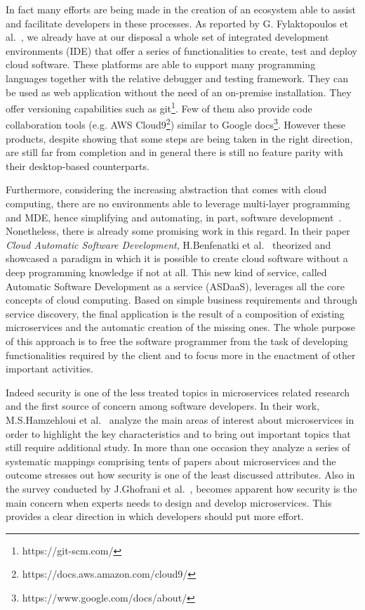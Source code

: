 \documentclass[a4paper, 10pt, conference]{ieeeconf}
\begin{document}
In fact many efforts are being made in the creation of an ecosystem able to assist and facilitate developers in these processes. As reported by G. Fylaktopoulos et al.~\cite{overview-platforms}, we already have at our disposal a whole set of integrated development environments (IDE) that offer a series of functionalities to create, test and deploy cloud software.  These platforms are able to support many programming languages together with the relative debugger and testing framework. They can be used as web application without the need of an on-premise installation. They offer versioning capabilities such as git\footnote{https://git-scm.com/}. Few of them also provide code collaboration tools (e.g. AWS Cloud9\footnote{https://docs.aws.amazon.com/cloud9/}) similar to Google docs\footnote{https://www.google.com/docs/about/}. However these products, despite showing that some steps are being taken in the right direction, are still far from completion and in general there is still no feature parity with their desktop-based counterparts.

Furthermore, considering the increasing abstraction that comes with cloud computing, there are no environments able to leverage multi-layer
programming and MDE, hence simplifying and automating, in part, software development~\cite{overview-platforms}. Nonetheless, there is already some promising work in this regard. In their paper \textit{Cloud Automatic Software Development}, H.Benfenatki et al.~\cite{automatic-dev} theorized and showcased a paradigm in which it is possible to create cloud software without a deep programming knowledge if not at all. This new kind of service, called Automatic Software Development as a service (ASDaaS), leverages all the core concepts of cloud computing. Based on simple business requirements and through service discovery, the final application is the result of a composition of existing microservices and the automatic creation of the missing ones. The whole purpose of this approach is to free the software programmer from the task of developing functionalities required by the client and to focus more in the enactment of other important activities.

Indeed security is one of the less treated topics in microservices related research and the first source of concern among software developers. In their work, M.S.Hamzehloui et al.~\cite{research-mss} analyze the main areas of interest about microservices in order to highlight the key characteristics and to bring out important topics that still require additional study. In more than one occasion they analyze a series of systematic mappings comprising tents of papers about microservices and the outcome stresses out how security is one of the least discussed attributes. Also in the survey conducted by J.Ghofrani et al.~\cite{challenges-mss}, becomes apparent how security is the main concern when experts needs to design and develop microservices. This provides a clear direction in which developers should put more effort.
\end{document}

